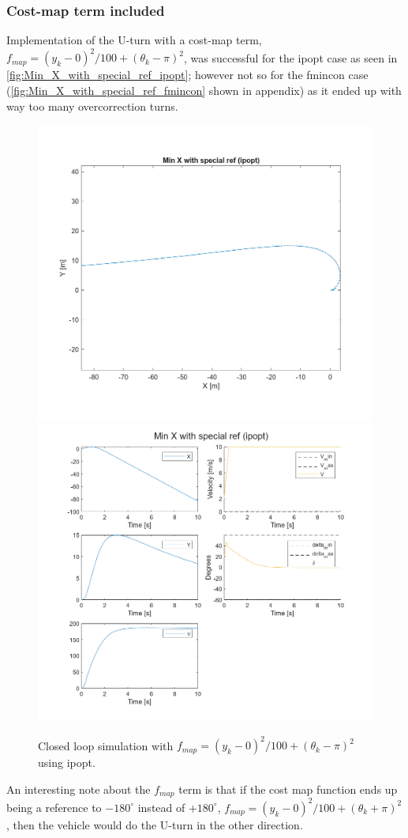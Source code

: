\documentclass[]{IEEEtran}
\begin{document}
\subsubsection{Cost-map term included}
Implementation of the U-turn with a cost-map term, $f_{map} = (y_k-0)^2/100 + (\theta_k - \pi)^2$, was successful for the ipopt case as seen in \autoref{fig:Min_X_with_special_ref_ipopt}; however not so for the fmincon case (\autoref{fig:Min_X_with_special_ref_fmincon} shown in appendix) as it ended up with way too many overcorrection turns.
\begin{figure}[h]
    \centering
    \includegraphics[width = 0.45\columnwidth]{figs/Min_X_with_special_ref_(ipopt)_quiver.png}
    \includegraphics[width = \columnwidth]{figs/Min_X_with_special_ref_(ipopt)_traj.png}	
    \caption{Closed loop simulation with $f_{map} = (y_k-0)^2/100 + (\theta_k - \pi)^2$ using ipopt.}\label{fig:Min_X_with_special_ref_ipopt}
\end{figure}
An interesting note about the $f_{map}$ term is that if the cost map function ends up being a reference to $-180^\circ$ instead of $+180^\circ$, $f_{map} = (y_k-0)^2/100 + (\theta_k + \pi)^2$, then the vehicle would do the U-turn in the other direction.
\end{document}
